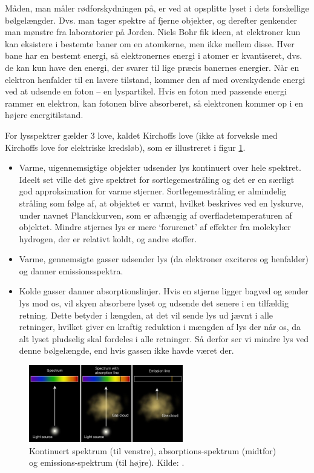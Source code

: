Måden, man måler rødforskydningen på, er ved at opsplitte lyset i dets forskellige bølgelængder. Dvs. man tager spektre af fjerne objekter, og derefter genkender man mønstre fra laboratorier på Jorden. Niels Bohr fik ideen, at elektroner kun kan eksistere i bestemte baner om en atomkerne, men ikke mellem disse. Hver bane har en bestemt energi, så elektronernes energi i atomer er kvantiseret, dvs. de kan kun have den energi, der svarer til lige præcis banernes energier. %
Når en elektron henfalder til en lavere tilstand, kommer den af med overskydende energi ved at udsende en foton -- en lyspartikel. Hvis en foton med passende energi rammer en elektron, kan fotonen blive absorberet, så elektronen kommer op i en højere energitilstand. 

For lysspektrer gælder 3 love, kaldet Kirchoffs love (ikke at forveksle med Kirchoffs love for elektriske kredsløb), som er illustreret i figur \ref{kirchoff}.
\begin{itemize}
	\item Varme, uigennemsigtige objekter udsender lys kontinuert over hele spektret. Ideelt set ville det give spektret for sortlegemestråling og det er en særligt god approksimation for varme stjerner. Sortlegemestråling er almindelig stråling som følge af, at objektet er varmt, hvilket beskrives ved en lyskurve, under navnet Planckkurven, som er afhængig af overfladetemperaturen af objektet. Mindre stjernes lys er mere `forurenet' af effekter fra molekylær hydrogen, der er relativt koldt, og andre stoffer.
	\item Varme, gennemsigte gasser udsender lys (da elektroner exciteres og henfalder) og danner emissionsspektra.
	\item Kolde gasser danner absorptionslinjer. Hvis en stjerne ligger bagved og sender lys mod os, vil skyen absorbere lyset og udsende det senere i en tilfældig retning. Dette betyder i længden, at det vil sende lys ud jævnt i alle retninger, hvilket giver en kraftig reduktion i mængden af lys der når os, da alt lyset pludselig skal fordeles i alle retninger. Så derfor ser vi mindre lys ved denne bølgelængde, end hvis gassen ikke havde været der.
\end{itemize}

\begin{figure}[h]
	\centering
	\includegraphics[width=0.6\textwidth]{Kosmo/2017/img/kirchoffslaws.jpg}
	\caption{Kontinuert spektrum (til venstre), absorptions-spektrum (midtfor) og
		emissions-spektrum (til højre). Kilde: \cite{AbsorptionEmissionSpectra}.}
	\label{kirchoff}
\end{figure}

